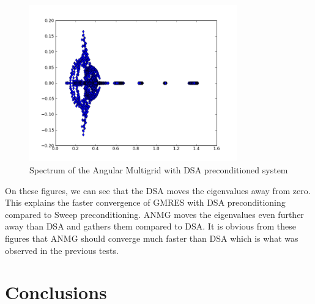 \documentclass[preprint,10pt]{elsarticle}
\renewcommand{\(}{\left(}
\renewcommand{\)}{\right)}
\renewcommand{\[}{\left[}
\renewcommand{\]}{\right]}
\begin{document}
\begin{figure}[H]
\centering
\includegraphics[width=9cm]{p_s8_5_5}
\caption{Spectrum of the Angular Multigrid with DSA preconditioned system}
\end{figure}

On these figures, we can see that the DSA moves the eigenvalues away from
zero. This explains the faster convergence of GMRES with DSA preconditioning
compared to Sweep preconditioning. ANMG moves the
eigenvalues even further away than DSA and gathers them compared to DSA.
It is obvious from these figures that ANMG should converge much faster than
DSA which is what was observed in the previous tests. 

\section{Conclusions} \label{sec:ccl}
\end{document}
